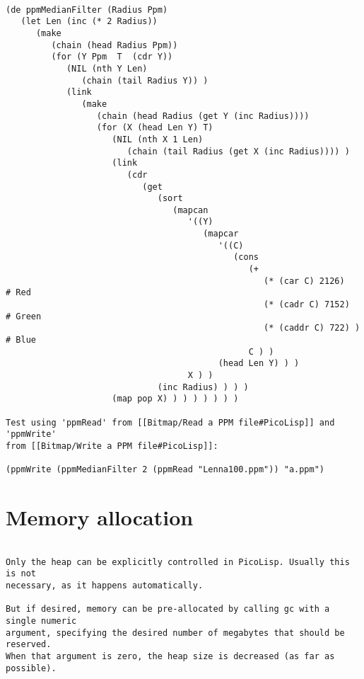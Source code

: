 \begin{verbatim}

(de ppmMedianFilter (Radius Ppm)
   (let Len (inc (* 2 Radius))
      (make
         (chain (head Radius Ppm))
         (for (Y Ppm  T  (cdr Y))
            (NIL (nth Y Len)
               (chain (tail Radius Y)) )
            (link
               (make
                  (chain (head Radius (get Y (inc Radius))))
                  (for (X (head Len Y) T)
                     (NIL (nth X 1 Len)
                        (chain (tail Radius (get X (inc Radius)))) )
                     (link
                        (cdr
                           (get
                              (sort
                                 (mapcan
                                    '((Y)
                                       (mapcar
                                          '((C)
                                             (cons
                                                (+
                                                   (* (car C) 2126)     # Red
                                                   (* (cadr C) 7152)    # Green
                                                   (* (caddr C) 722) )  # Blue
                                                C ) )
                                          (head Len Y) ) )
                                    X ) )
                              (inc Radius) ) ) )
                     (map pop X) ) ) ) ) ) ) )

Test using 'ppmRead' from [[Bitmap/Read a PPM file#PicoLisp]] and 'ppmWrite'
from [[Bitmap/Write a PPM file#PicoLisp]]:

(ppmWrite (ppmMedianFilter 2 (ppmRead "Lenna100.ppm")) "a.ppm")

\end{verbatim}

\section*{Memory allocation}

\begin{verbatim}

Only the heap can be explicitly controlled in PicoLisp. Usually this is not
necessary, as it happens automatically.

But if desired, memory can be pre-allocated by calling gc with a single numeric
argument, specifying the desired number of megabytes that should be reserved.
When that argument is zero, the heap size is decreased (as far as possible).

\end{verbatim}

